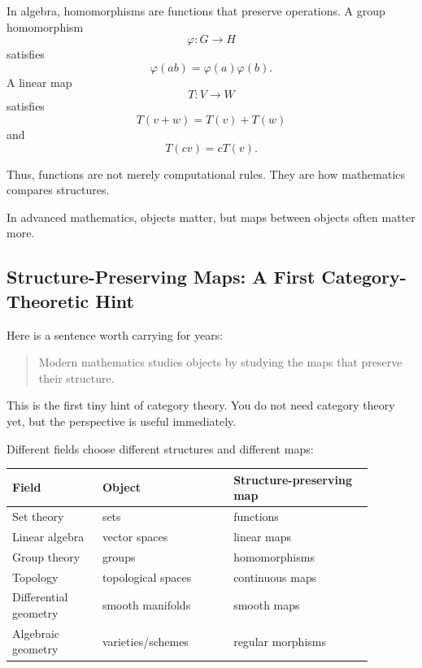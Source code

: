 In algebra, homomorphisms are functions that preserve operations. A group homomorphism
\[
\varphi:G\to H
\]
satisfies
\[
\varphi(ab)=\varphi(a)\varphi(b).
\]
A linear map
\[
T:V\to W
\]
satisfies
\[
T(v+w)=T(v)+T(w)
\]
and
\[
T(cv)=cT(v).
\]

Thus, functions are not merely computational rules. They are how mathematics compares structures.

\begin{focusbox}
In advanced mathematics, objects matter, but maps between objects often matter more.
\end{focusbox}

\subsection{Structure-Preserving Maps: A First Category-Theoretic Hint}

Here is a sentence worth carrying for years:

\begin{quote}
Modern mathematics studies objects by studying the maps that preserve their structure.
\end{quote}

This is the first tiny hint of category theory. You do not need category theory yet, but the perspective is useful immediately.

\begin{center}
\end{center}

Different fields choose different structures and different maps:

\begin{longtable}{p{0.22\linewidth}p{0.32\linewidth}p{0.34\linewidth}}
\toprule
Field & Object & Structure-preserving map \\
\midrule
Set theory & sets & functions \\
Linear algebra & vector spaces & linear maps \\
Group theory & groups & homomorphisms \\
Topology & topological spaces & continuous maps \\
Differential geometry & smooth manifolds & smooth maps \\
Algebraic geometry & varieties/schemes & regular morphisms \\
\bottomrule
\end{longtable}

